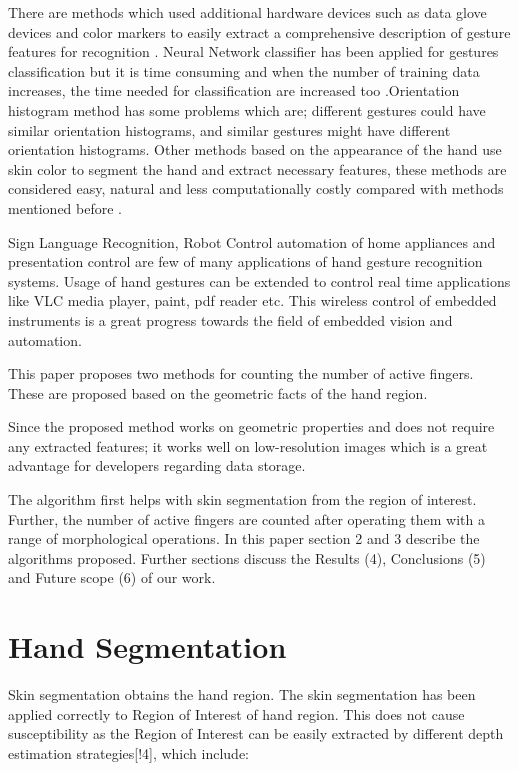 \documentclass[conference]{IEEEtran}
\begin{document}
 There are methods which used additional hardware devices such as data glove devices and color markers to easily extract a comprehensive description of gesture features for recognition\cite{1199054} . Neural Network classifier has been applied for gestures classification \cite{Murakami:1991:GRU:108844.108900} but it is time consuming and when the number of training data increases, the time needed for classification are increased too .Orientation histogram method \cite{freeman1995orientation} has some problems which are; different gestures could have similar orientation histograms, and similar gestures might have different orientation histograms. Other methods based on the appearance of the hand use skin color to segment the hand and extract necessary features, these methods are considered easy, natural and less computationally costly compared with methods mentioned before \cite{1199054} .

Sign Language Recognition, Robot Control automation of home appliances and presentation control are few of many applications of hand gesture recognition systems. Usage of hand gestures can be extended to control real time applications like VLC media player, paint, pdf reader etc. This wireless control of embedded instruments is a great progress towards the field of embedded vision and automation.

This paper proposes two methods for counting the number of active fingers. These are proposed based on the geometric facts of the hand region. 

Since the proposed method works on geometric properties and does not require any extracted features; it works well on low-resolution images which is a great advantage for developers regarding data storage.

The algorithm first helps with skin segmentation from the region of interest. Further, the number of active fingers are counted after operating them with a range of morphological operations.
In this paper section 2 and 3 describe the algorithms proposed. Further sections discuss the Results (4), Conclusions (5) and Future scope (6) of our work. 




\section{Hand Segmentation}

Skin segmentation obtains the hand region. The skin segmentation has been applied correctly to Region of Interest of hand region. This does not cause susceptibility as the Region of Interest can be easily extracted by different depth estimation strategies[!4], which include:
\end{document}
